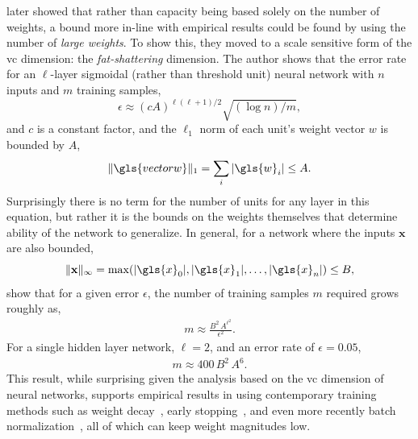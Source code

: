 \documentclass[thesis]{subfiles}
\begin{document}
    \citet{bartlett1997} later showed that rather than capacity being based solely on the number of weights, a bound more in-line with empirical results could be found by using the number of \emph{large weights}. To show this, they moved to a scale sensitive form of the \gls{vc} dimension: the \emph{fat-shattering} dimension. The author shows that the error rate for an $\ell$-layer sigmoidal (rather than threshold unit) neural network with $n$ inputs and $m$ training samples,
    \begin{equation}
        \epsilon \approx (cA)^{\ell(\ell+1)/2} \sqrt{(\log n)/m},
    \end{equation}
    and $c$ is a constant factor, and the $\ell_1$ norm of each unit's weight vector $w$ is bounded by $A$, 
    \begin{equation}
    \|\gls{vectorw}\|_1 = \sum_i | \gls{w}_i | \leq A.
    \end{equation}
    Surprisingly there is no term for the number of units for any layer in this equation, but rather it is the bounds on the weights themselves that determine ability of the network to generalize. In general, for a network where the inputs $\mathbf{x}$ are also bounded,
    \begin{equation}
        \|\mathbf{x}\|_\infty = \max(|\gls{x}_0|, |\gls{x}_1|, \ldots, |\gls{x}_n|) \leq B,
    \end{equation}
    \citet{bartlett1997} show that for a given error $\epsilon$, the number of training samples $m$ required grows roughly as,
    \begin{align}
        m \approx \frac{B^2\,A^{\ell^2}}{\epsilon^2}.
    \end{align}
    For a single hidden layer network, \ie $\ell=2$, and an error rate of $\epsilon=0.05$, 
    \begin{align}
        m \approx 400\,B^2\,A^6.
    \end{align}
    This result, while surprising given the analysis based on the \gls{vc} dimension of neural networks, supports empirical results in using contemporary training methods such as weight decay~\citep{hinton1987learning}, early stopping~\citep{Bishop1995}, and even more recently batch normalization~\citep{Ioffe2015}, all of which can keep weight magnitudes low.
    
\end{document}
